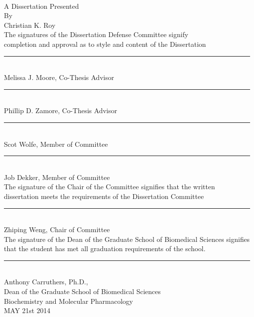 \begin{titlepage}\label{hd:titlePage}
\begin{center}
		\ttitle \\[0.25cm]

		A Dissertation Presented \\[0.25cm]
		By \\[0.25cm]
		Christian K. Roy \\[0.25cm]
 
		The signatures of the Dissertation Defense Committee signify \\
		completion and approval as to style and content of the Dissertation\\[1cm]
		\rule[1em]{25em}{1pt}\\[-0.6cm]%
		Melissa J. Moore, Co-Thesis Advisor\\[1cm]
		\rule[1em]{25em}{1pt}\\[-0.6cm]
		Phillip D. Zamore, Co-Thesis Advisor\\[1cm]
		\rule[1em]{25em}{1pt}\\[-0.6cm]
		Scot Wolfe, Member of Committee\\[1cm]
		\rule[1em]{25em}{1pt}\\[-0.6cm]
		Job Dekker, Member of Committee\\[0.25cm]
		The signature of the Chair of the Committee signifies that the written
		dissertation meets the requirements of the Dissertation Committee\\[1cm]
		\rule[1em]{25em}{1pt}\\[-0.6cm]
		Zhiping Weng, Chair of Committee\\[0.25cm]
		The signature of the Dean of the Graduate School of Biomedical Sciences signifies that the student has met all graduation requirements of the school.\\[1cm]
		\rule[1em]{25em}{1pt}\\[-0.6cm]
		Anthony Carruthers, Ph.D.,\\[0.25cm]
		Dean of the Graduate School of Biomedical Sciences\\[0.25cm]
		Biochemistry and Molecular Pharmacology\\[0.25cm]
		MAY 21st 2014 

 \end{center}
 \end{titlepage}
\clearpage %
